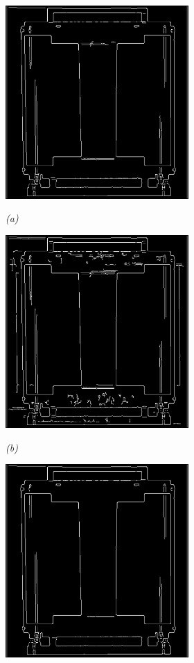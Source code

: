 \begin{figure}[htb]
  \begin{minipage}[b]{2.75in}
    \centering
    \centerline{\mbox{\includegraphics[width=2.75in]{data_extraction/images/canny/default/20121017_141.eps}}}
    \centerline{\emph{(a)}}
  \end{minipage}\medskip
  \begin{minipage}[b]{2.75in}
    \centering
    \centerline{\mbox{\includegraphics[width=2.75in]{data_extraction/images/canny/0.01_0.02/20121017_141.eps}}}
    \centerline{\emph{(b)}}
  \end{minipage}
  \begin{minipage}[b]{2.75in}
    \centering
    \centerline{\mbox{\includegraphics[width=2.75in]{data_extraction/images/canny/0.02_0.04/20121017_141.eps}}}

\end{minipage}
\end{figure}
